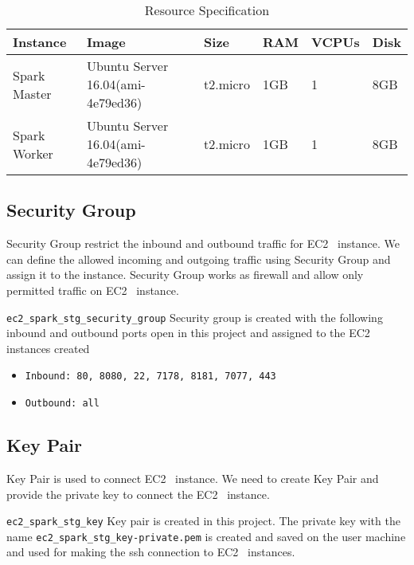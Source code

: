 \begin{table}[]
	\centering 
	\caption{Resource Specification} 
	\label{t:resource-specification}
	\begin{tabular}{|l|l|l|l|l|l|} 
	\hline \textbf{Instance} & \textbf{Image} & \textbf{Size} & \textbf{RAM} & \textbf{VCPUs} & \textbf{Disk} \\ 
	\hline Spark Master & Ubuntu Server 16.04(ami-4e79ed36) & t2.micro & 1GB & 1 & 8GB \\
    \hline Spark Worker & Ubuntu Server 16.04(ami-4e79ed36) & t2.micro & 1GB & 1 & 8GB \\ 
    \hline 
	\end{tabular}
\end{table}

\subsection{Security Group}

Security Group restrict the inbound and outbound traffic for
EC2~\cite{hid-sp18-511-www-ec2} instance.  We can define the allowed
incoming and outgoing traffic using Security Group and assign it to
the instance.  Security Group works as firewall and allow only
permitted traffic on EC2~\cite{hid-sp18-511-www-ec2} instance.

\verb|ec2_spark_stg_security_group| Security group is created with the
following inbound and outbound ports open in this project and assigned to the
EC2~\cite{hid-sp18-511-www-ec2} instances created

\begin{itemize}
	\item \verb|Inbound: 80, 8080, 22, 7178, 8181, 7077, 443|
	\item \verb|Outbound: all|
	
\end{itemize}

\subsection{Key Pair}

Key Pair is used to connect EC2~\cite{hid-sp18-511-www-ec2}
instance. We need to create Key Pair and provide the private key to
connect the EC2~\cite{hid-sp18-511-www-ec2} instance.

\verb|ec2_spark_stg_key| Key pair is created in this project.
The private key with the name \verb|ec2_spark_stg_key-private.pem| is
created and saved on the user machine and used for making the ssh connection to
EC2~\cite{hid-sp18-511-www-ec2} instances.

